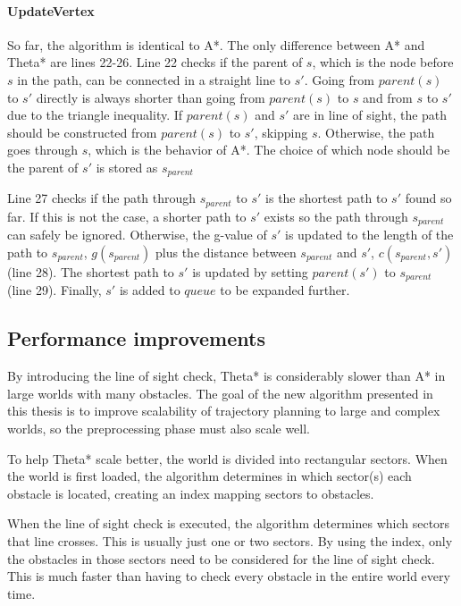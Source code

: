 \paragraph{UpdateVertex}
So far, the algorithm is identical to A*. The only difference between A* and Theta* are lines 22-26. Line 22 checks if the parent of $s$, which is the node before $s$ in the path, can be connected in a straight line to $s'$. Going from $parent(s)$ to $s'$ directly is always shorter than going from $parent(s)$ to $s$ and from $s$ to $s'$ due to the triangle inequality. If $parent(s)$ and $s'$ are in line of sight, the path should be constructed from $parent(s)$ to $s'$, skipping $s$. Otherwise, the path goes through $s$, which is the behavior  of A*. The choice of which node should be the parent of $s'$ is stored as $s_{parent}$
\par
Line 27 checks if the path through $s_{parent}$ to $s'$ is the shortest path to $s'$ found so far. If this is not the case, a shorter path to $s'$ exists so the  path through $s_{parent}$ can safely be ignored. Otherwise, the g-value of $s'$ is updated to the length of the path to $s_{parent}$, $g(s_{parent})$ plus the distance between $s_{parent}$ and $s'$, $c(s_{parent},s')$ (line 28). The shortest path to $s'$ is updated by setting $parent(s')$ to $s_{parent}$ (line 29). Finally, $s'$ is added to $queue$ to be expanded further.
\subsection{Performance improvements}
By introducing the line of sight check, Theta* is considerably slower than A* in large worlds with many obstacles. The goal of the new algorithm presented in this thesis is to improve scalability of trajectory planning to large and complex worlds, so the preprocessing phase must also scale well.
\par
To help Theta* scale better, the world is divided into rectangular sectors. When the world is first loaded, the algorithm determines in which sector(s) each obstacle is located, creating an index mapping sectors to obstacles. \
\par
When the line of sight check is executed, the algorithm determines which sectors that line crosses. This is usually just one or two sectors. By using the index, only the obstacles in those sectors need to be considered for the line of sight check. This is much faster than having to check every obstacle in the entire world every time.



